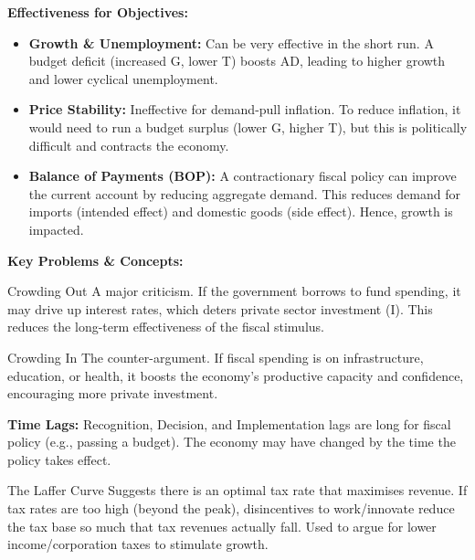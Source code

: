\documentclass[11pt, a4paper, twoside]{book}
\begin{document}
\textbf{Effectiveness for Objectives:}
\begin{itemize}
  \item \textbf{Growth \& Unemployment:} Can be very effective in the short run. A budget deficit (increased G, lower T) boosts AD, leading to higher growth and lower cyclical unemployment.
  \item \textbf{Price Stability:} Ineffective for demand-pull inflation. To reduce inflation, it would need to run a budget surplus (lower G, higher T), but this is politically difficult and contracts the economy.
  \item \textbf{Balance of Payments (BOP):} A contractionary fiscal policy can improve the current account by reducing aggregate demand. This reduces demand for imports (intended effect) and domestic goods (side effect). Hence, growth is impacted.
\end{itemize}

\textbf{Key Problems \& Concepts:}

\begin{keyterm}{Crowding Out}
A major criticism. If the government borrows to fund spending, it may drive up interest rates, which deters private sector investment (I). This reduces the long-term effectiveness of the fiscal stimulus.
\end{keyterm}

\begin{keyterm}{Crowding In}
The counter-argument. If fiscal spending is on infrastructure, education, or health, it boosts the economy's productive capacity and confidence, encouraging more private investment.
\end{keyterm}

\textbf{Time Lags:} Recognition, Decision, and Implementation lags are long for fiscal policy (e.g., passing a budget). The economy may have changed by the time the policy takes effect.

\begin{keyterm}{The Laffer Curve}
Suggests there is an optimal tax rate that maximises revenue. If tax rates are too high (beyond the peak), disincentives to work/innovate reduce the tax base so much that tax revenues actually fall. Used to argue for lower income/corporation taxes to stimulate growth.
\end{keyterm}
\end{document}

